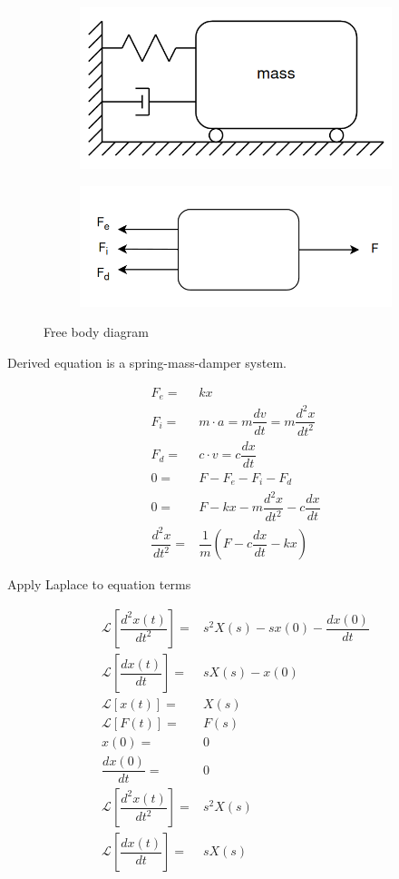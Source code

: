 \begin{figure}[H]
	\centering
	\begin{subfigure}{.5\textwidth}
		\centering
		\includegraphics[width=0.7\linewidth]{../resources/figures/spring_damper_diagram.png}
	\end{subfigure}%
	\begin{subfigure}{.5\textwidth}
		\centering
		\includegraphics[width=\linewidth]{../resources/figures/free_body_diagram.png}
	\end{subfigure}
	\caption{Free body diagram}
	\label{fig:free_body_diagram}
\end{figure}


Derived equation is a spring-mass-damper system.

\begin{align}
	F_e = & kx \\
	F_i = & m \cdot a = m \dfrac{dv}{dt} = m \dfrac{d^2 x}{d t^2} \\
	F_d = & c \cdot v = c \dfrac{dx}{dt} \\
	0 = & F - F_e - F_i - F_d \\
	0 = & F - kx - m \dfrac{d^2 x}{d t^2} - c \dfrac{dx}{dt} \\
	\dfrac{d^2 x}{d t^2} = & \dfrac{1}{m} \left( F - c \dfrac{dx}{dt} - kx \right) 
\end{align}

Apply Laplace to equation terms

\begin{align}
	\mathcal{L}\left[ \dfrac{d^2 x(t)}{d t^2} \right] = & s^2 X(s) - sx(0) - \dfrac{dx(0)}{dt} \\
	\mathcal{L}\left[ \dfrac{dx(t)}{dt} \right] = & sX(s) - x(0) \\	
	\mathcal{L}\left[ x(t) \right] = & X(s) \\
	\mathcal{L}\left[ F(t) \right] = & F(s) \\
	x(0) = & 0 \\
	\dfrac{dx(0)}{dt} = & 0 \\
	\mathcal{L}\left[ \dfrac{d^2 x(t)}{d t^2} \right] = & s^2 X(s) \\
	\mathcal{L}\left[ \dfrac{dx(t)}{dt} \right] = & sX(s)
\end{align}

